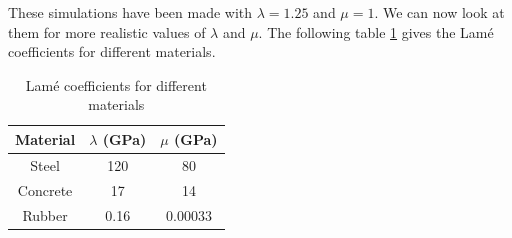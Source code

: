 \documentclass[a4paper,12pt,twoside]{report}
\begin{document}
These simulations have been made with $\lambda = 1.25$ and $\mu = 1$. We can now look at them for more realistic values of $\lambda$ and $\mu$. The following table \ref{tab:lame_coefficients} gives the Lamé coefficients for different materials. 
\begin{table}[h]
\centering
\begin{tabular}{|c|c|c|}
\hline
Material & $\lambda$ (GPa) & $\mu$ (GPa) \\
\hline
Steel & 120 & 80 \\
\hline
Concrete & 17 & 14 \\
\hline
Rubber & 0.16 & 0.00033 \\
\hline
\end{tabular}
\caption{Lamé coefficients for different materials}
\label{tab:lame_coefficients}
\end{table}
\end{document}
